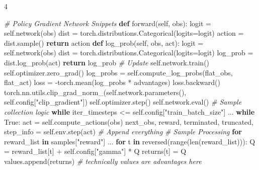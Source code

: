 \documentclass{article}
\newenvironment{Shaded}{\CodeFontSize\setlength{\topsep}{\CodeBlockSkip}\setlength{\partopsep}{0pt}}{}
\newcommand{\BuiltInTok}[1]{\textcolor[rgb]{0.00,0.50,0.00}{#1}}
\newcommand{\CommentTok}[1]{\textcolor[rgb]{0.38,0.63,0.69}{\textit{#1}}}
\newcommand{\ControlFlowTok}[1]{\textcolor[rgb]{0.00,0.44,0.13}{\textbf{#1}}}
\newcommand{\KeywordTok}[1]{\textcolor[rgb]{0.00,0.44,0.13}{\textbf{#1}}}
\newcommand{\NormalTok}[1]{#1}
\newcommand{\OperatorTok}[1]{\textcolor[rgb]{0.40,0.40,0.40}{#1}}
\newcommand{\StringTok}[1]{\textcolor[rgb]{0.25,0.44,0.63}{#1}}
\newcommand{\VariableTok}[1]{\textcolor[rgb]{0.10,0.09,0.49}{#1}}
\newcommand{\CodeFontSize}{\fontsize{3.6}{4}\selectfont}
\newlength{\CodeBlockSkip}
\newcommand{\NumCodeColumns}{4}  %
\begin{document}
\begin{multicols*}{\NumCodeColumns}
\begin{Shaded}
\begin{Highlighting}[]
\CommentTok{\# Policy Gradient Network Snippets}
\KeywordTok{def}\NormalTok{ forward(}\VariableTok{self}\NormalTok{, obs):}
\NormalTok{  logit }\OperatorTok{=} \VariableTok{self}\NormalTok{.network(obs)}
\NormalTok{  dist }\OperatorTok{=}\NormalTok{ torch.distributions.Categorical(logits}\OperatorTok{=}\NormalTok{logit)}
\NormalTok{  action }\OperatorTok{=}\NormalTok{ dist.sample()}
  \ControlFlowTok{return}\NormalTok{ action}
\KeywordTok{def}\NormalTok{ log\_prob(}\VariableTok{self}\NormalTok{, obs, act):}
\NormalTok{  logit }\OperatorTok{=} \VariableTok{self}\NormalTok{.network(obs)}
\NormalTok{  dist }\OperatorTok{=}\NormalTok{ torch.distributions.Categorical(logits}\OperatorTok{=}\NormalTok{logit)}
\NormalTok{  log\_prob }\OperatorTok{=}\NormalTok{ dist.log\_prob(act)}
  \ControlFlowTok{return}\NormalTok{ log\_prob}
\CommentTok{\# Update}
\VariableTok{self}\NormalTok{.network.train()}
\VariableTok{self}\NormalTok{.optimizer.zero\_grad()}
\NormalTok{log\_probs }\OperatorTok{=} \VariableTok{self}\NormalTok{.compute\_log\_probs(flat\_obs, flat\_act)}
\NormalTok{loss }\OperatorTok{=} \OperatorTok{{-}}\NormalTok{torch.mean(log\_probs }\OperatorTok{*}\NormalTok{ advantages)}
\NormalTok{loss.backward()}
\NormalTok{torch.nn.utils.clip\_grad\_norm\_(}\VariableTok{self}\NormalTok{.network.parameters(), }\VariableTok{self}\NormalTok{.config[}\StringTok{"clip\_gradient"}\NormalTok{])}
\VariableTok{self}\NormalTok{.optimizer.step()}
\VariableTok{self}\NormalTok{.network.}\BuiltInTok{eval}\NormalTok{()}
\CommentTok{\# Sample collection logic }
\ControlFlowTok{while}\NormalTok{ iter\_timesteps }\OperatorTok{\textless{}=} \VariableTok{self}\NormalTok{.config[}\StringTok{"train\_batch\_size"}\NormalTok{]}
\NormalTok{  ...}
  \ControlFlowTok{while} \VariableTok{True}\NormalTok{:}
\NormalTok{    act }\OperatorTok{=} \VariableTok{self}\NormalTok{.compute\_actions(obs)}
\NormalTok{    next\_obs, reward, terminated, truncated, step\_info }\OperatorTok{=} \VariableTok{self}\NormalTok{.env.step(act)}
    \CommentTok{\# Append everything}
\CommentTok{\# Sample Processing}
\ControlFlowTok{for}\NormalTok{ reward\_list }\KeywordTok{in}\NormalTok{ samples[}\StringTok{"reward"}\NormalTok{]}
\NormalTok{  ...}
  \ControlFlowTok{for}\NormalTok{ t }\KeywordTok{in} \BuiltInTok{reversed}\NormalTok{(}\BuiltInTok{range}\NormalTok{(}\BuiltInTok{len}\NormalTok{(reward\_list))):}
\NormalTok{    Q }\OperatorTok{=}\NormalTok{ reward\_list[t] }\OperatorTok{+} \VariableTok{self}\NormalTok{.config[}\StringTok{"gamma"}\NormalTok{] }\OperatorTok{*}\NormalTok{ Q}
\NormalTok{    returns[t] }\OperatorTok{=}\NormalTok{ Q}
\NormalTok{  values.append(returns) }\CommentTok{\# technically values are advantages here}
\end{Highlighting}
\end{Shaded}


\end{multicols*}
\end{document}
